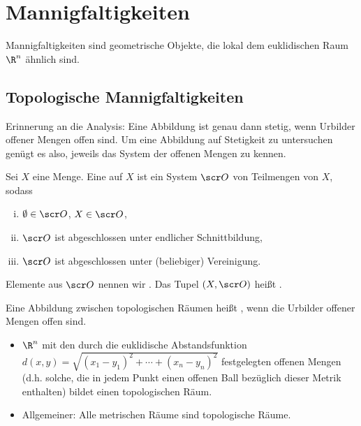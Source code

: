 \chapter{Mannigfaltigkeiten}

Mannigfaltigkeiten sind geometrische Objekte, die lokal dem euklidischen Raum $\R^n$ ähnlich sind.

\section{Topologische Mannigfaltigkeiten}

Erinnerung an die Analysis:
Eine Abbildung ist genau dann stetig, wenn Urbilder offener Mengen offen sind.
Um eine Abbildung auf Stetigkeit zu untersuchen genügt es also, jeweils das System der offenen Mengen zu kennen.

\begin{df} \label{1.1} %
    Sei $X$ eine Menge.
    Eine  auf $X$ ist ein System $\scr O$ von Teilmengen von $X$, sodass
    \begin{enumerate}[(i)]
        \item
            $\emptyset \in \scr O$, $X \in \scr O$,
        \item
            $\scr O$ ist abgeschlossen unter endlicher Schnittbildung,
        \item
            $\scr O$ ist abgeschlossen unter (beliebiger) Vereinigung.
    \end{enumerate}
    Elemente aus $\scr O$ nennen wir .
    Das Tupel $(X, \scr O)$ heißt .

    Eine Abbildung zwischen topologischen Räumen heißt , wenn die Urbilder offener Mengen offen sind.
\end{df}

\begin{ex*}
    \begin{itemize}
        \item
            $\R^n$ mit den durch die euklidische Abstandsfunktion
            \begin{math}
                d(x,y) = \sqrt{(x_1 - y_1)^2 + \dotsb + (x_n - y_n)^2}
            \end{math}
            festgelegten offenen Mengen (d.h. solche, die in jedem Punkt einen offenen Ball bezüglich dieser Metrik enthalten) bildet einen topologischen Räum.
        \item
            Allgemeiner: Alle metrischen Räume sind topologische Räume.
    \end{itemize}
\end{ex*}

